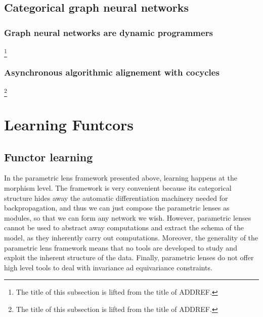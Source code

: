 \documentclass[12pt,a4paper,openright,twoside]{report}
\theoremstyle{plain}
\theoremstyle{definition}
\begin{document}
\section{Categorical graph neural networks}

\subsection{Graph neural networks are dynamic programmers}\footnote{The title of this subsection is lifted from the title of ADDREF.}

\subsection{Asynchronous algorithmic alignement with cocycles}\footnote{The title of this subsection is lifted from the title of ADDREF.}
























\chapter{Learning Funtcors}


\lhead[\fancyplain{}{\bfseries\thepage}]{\fancyplain{}{\bfseries\rightmark}}

\section{Functor learning}

In the parametric lens framework presented above, learning happens at the morphism level. The framework is very convenient because its categorical structure hides away the automatic differentiation machinery needed for backpropagation, and thus we can just compose the parametric lenses as modules, so that we can form any network we wish. However, parametric lenses cannot be used to abstract away computations and extract the schema of the model, as they inherently carry out computations. Moreover, the generality of the parametric lens framework means that no tools are developed to study and exploit the inherent structure of the data. Finally, parametric lenses do not offer high level tools to deal with invariance ad equivariance constraints. 
\end{document}
